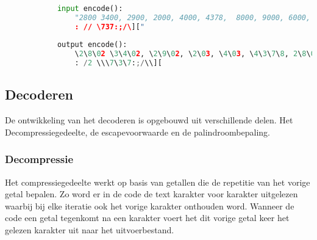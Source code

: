 \documentclass{article}
\begin{document}
       
       \begin{lstlisting}[frame=single, language=python]  % Start your code-block
            
            input encode():
                "2800 3400, 2900, 2000, 4000, 4378,  8000, 9000, 6000, 5689, 3478, 4085, 7095, 1010,1785, 3000,8090
                : // \737:;/\]["
    
            output encode():
                \2\8\02 \3\4\02, \2\9\02, \2\03, \4\03, \4\3\7\8, 2\8\03, \9\03, \6\03, \5\6\8\9, \3\4\7\8, \4\0\8\5, \7\0\9\5, \1\0\1\0,\1\7\8\5, \3\03,\8\0\9\0
                : /2 \\\7\3\7:;/\\][
        \end{lstlisting}
       
    \subsection{Decoderen}
    De ontwikkeling van het decoderen is opgebouwd uit verschillende delen. Het Decompressiegedeelte, de escapevoorwaarde en de palindroombepaling. 
    
     \subsubsection{Decompressie}
    Het compressiegedeelte werkt op basis van getallen die de repetitie van het vorige getal bepalen. Zo word er in de code de text karakter voor karakter uitgelezen waarbij bij elke iteratie ook het vorige karakter onthouden word. Wanneer de code een getal tegenkomt na een karakter voert het dit vorige getal keer het gelezen karakter uit naar het uitvoerbestand. 
    
\end{document}
